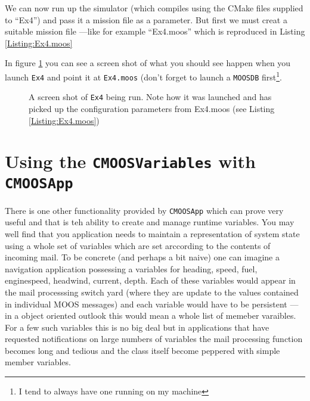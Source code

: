\documentclass[a4paper,10pt]{article}
\newcommand{\Code}[1]{\texttt{#1} }
\newcommand{\code}[1]{\Code{#1} }
\begin{document}


We can now run up the simulator (which compiles using the CMake files supplied to ``Ex4'') and pass it a mission file as a parameter. But first we must creat a suitable mission file ---like for example ``Ex4.moos'' which is reproduced in Listing \ref{Listing:Ex4.moos}



In figure \ref{Fig:RunningEx4} you can see a screen shot of what you should see happen when you launch \code{Ex4} and point it at \code{Ex4.moos} (don't forget to launch a \code{MOOSDB} first\footnote{I tend to always have one running on my machine}.

\begin{figure}
\begin{center}
\end{center}
\caption{A screen shot of \code{Ex4} being run. Note how it was launched and has picked up the configuration parameters from Ex4.moos (see Listing \ref{Listing:Ex4.moos})}\label{Fig:RunningEx4}
\end{figure}


\section{Using the \code{CMOOSVariables} with \code{CMOOSApp}} \label{Sec:CMOOSVariable}

There is one other functionality provided by \code{CMOOSApp} which can prove very useful and that is teh ability to create and manage runtime variables. You may well find that you application needs to maintain a representation of system state using a whole set of variables which are set arccording to the contents of incoming mail. To be concrete (and perhaps a bit naive) one can imagine a navigation application possessing a variables for heading, speed, fuel, enginespeed, headwind, current, depth. Each of these variables would appear in the mail processsing switch yard (where they are update to the values contained in individual MOOS messages) and each variable would have to be persistent --- in a object oriented outlook this would mean a whole list of memeber varaibles. For a few such variables this is no big deal but in applications that have requested notifications on large numbers of variables the mail processing function becomes long and tedious and the class itself become peppered with simple member variables.
\end{document}
